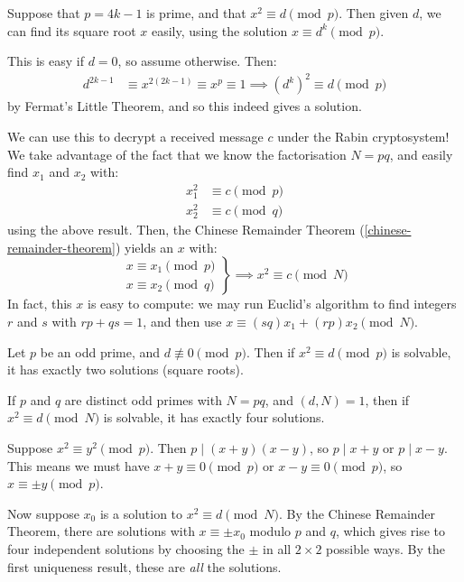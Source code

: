 \documentclass{article}
\begin{document}
\begin{proposition}
    Suppose that $p = 4k-1$ is prime, and that $x^2 \equiv d \pmod p$. Then given $d$, we can find its square root $x$ easily, using the solution $x \equiv d^k \pmod p$.
\end{proposition}

\begin{prf}
    This is easy if $d = 0$, so assume otherwise. Then:
    \begin{align*}
		d^{2k-1} &\equiv x^{2(2k-1)} \equiv x^{p} \equiv 1 \implies (d^k)^2 \equiv d \pmod p
	\end{align*}
	by Fermat's Little Theorem, and so this indeed gives a solution.
\end{prf}

We can use this to decrypt a received message $c$ under the Rabin cryptosystem! We take advantage of the fact that we know the factorisation $N = pq$, and easily find $x_1$ and $x_2$ with:
\begin{align*}
    x_1^2 &\equiv c \pmod p \\
    x_2^2 &\equiv c \pmod q
\end{align*}
using the above result. Then, the Chinese Remainder Theorem (\ref{chinese-remainder-theorem}) yields an $x$ with:
\[
\left.\begin{aligned}
x \equiv x_1 \pmod p \\
x \equiv x_2 \pmod q
\end{aligned}\right\rbrace \implies
x^2 \equiv c \pmod N
\]
In fact, this $x$ is easy to compute: we may run Euclid's algorithm to find integers $r$ and $s$ with $rp + qs = 1$, and then use $x \equiv (sq)x_1 + (rp)x_2 \pmod N$.

\begin{proposition}
    Let $p$ be an odd prime, and $d \not\equiv 0 \pmod p$. Then if $x^2 \equiv d \pmod p$ is solvable, it has exactly two solutions (square roots).
    
    If $p$ and $q$ are distinct odd primes with $N = pq$, and $(d, N) = 1$, then if $x^2 \equiv d \pmod N$ is solvable, it has exactly four solutions.
\end{proposition}

\begin{prf}
    Suppose $x^2 \equiv y^2 \pmod p$. Then $p \mid (x+y)(x-y)$, so $p \mid x+y$ or $p \mid x-y$. This means we must have $x + y \equiv 0 \pmod p$ or $x - y \equiv 0 \pmod p$, so $x \equiv \pm y \pmod p$.
    
    Now suppose $x_0$ is a solution to $x^2 \equiv d \pmod N$. By the Chinese Remainder Theorem, there are solutions with $x \equiv \pm x_0$ modulo $p$ and $q$, which gives rise to four independent solutions by choosing the $\pm$ in all $2 \times 2$ possible ways. By the first uniqueness result, these are \textit{all} the solutions.
\end{prf}
\end{document}
